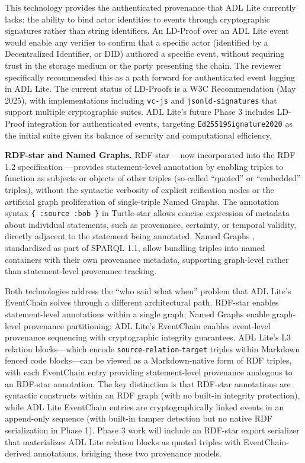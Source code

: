 This technology provides the authenticated provenance that ADL Lite currently lacks: the ability to bind actor identities to events through cryptographic signatures rather than string identifiers. An LD-Proof over an ADL Lite event would enable any verifier to confirm that a specific actor (identified by a Decentralized Identifier, or DID) authored a specific event, without requiring trust in the storage medium or the party presenting the chain. The reviewer specifically recommended this as a path forward for authenticated event logging in ADL Lite. The current status of LD-Proofs is a W3C Recommendation (May 2025), with implementations including \texttt{vc-js} and \texttt{jsonld-signatures} that support multiple cryptographic suites. ADL Lite's future Phase 3 includes LD-Proof integration for authenticated events, targeting \texttt{Ed25519Signature2020} as the initial suite given its balance of security and computational efficiency.

\textbf{RDF-star and Named Graphs.} RDF-star \cite{ref46}---now incorporated into the RDF 1.2 specification \cite{ref47}---provides statement-level annotation by enabling triples to function as subjects or objects of other triples (so-called ``quoted'' or ``embedded'' triples), without the syntactic verbosity of explicit reification nodes or the artificial graph proliferation of single-triple Named Graphs. The annotation syntax \texttt{\{\textbar{}\ :source\ :bob\ \textbar{}\}} in Turtle-star allows concise expression of metadata about individual statements, such as provenance, certainty, or temporal validity, directly adjacent to the statement being annotated. Named Graphs \cite{ref41}, standardized as part of SPARQL 1.1, allow bundling triples into named containers with their own provenance metadata, supporting graph-level rather than statement-level provenance tracking.

Both technologies address the ``who said what when'' problem that ADL Lite's EventChain solves through a different architectural path. RDF-star enables statement-level annotations within a single graph; Named Graphs enable graph-level provenance partitioning; ADL Lite's EventChain enables event-level provenance sequencing with cryptographic integrity guarantees. ADL Lite's L3 relation blocks---which encode \texttt{source}-\texttt{relation}-\texttt{target} triples within Markdown fenced code blocks---can be viewed as a Markdown-native form of RDF triples, with each EventChain entry providing statement-level provenance analogous to an RDF-star annotation. The key distinction is that RDF-star annotations are syntactic constructs within an RDF graph (with no built-in integrity protection), while ADL Lite EventChain entries are cryptographically linked events in an append-only sequence (with built-in tamper detection but no native RDF serialization in Phase 1). Phase 3 work will include an RDF-star export serializer that materializes ADL Lite relation blocks as quoted triples with EventChain-derived annotations, bridging these two provenance models.

